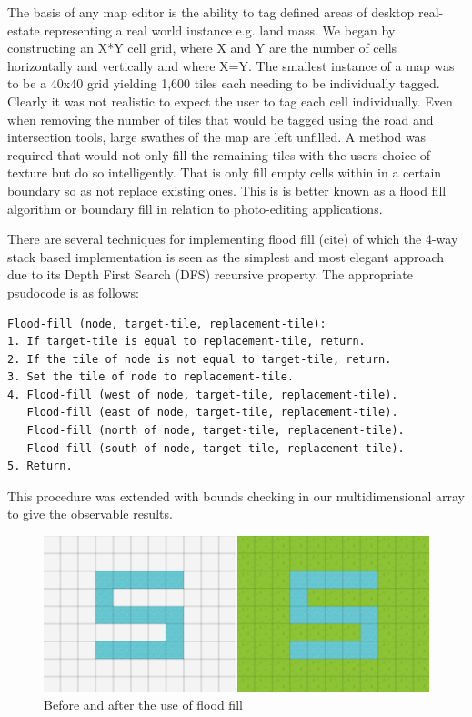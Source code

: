 The basis of any map editor is the ability to tag defined areas of desktop real-estate representing a real world instance e.g. land mass. We began by constructing an X*Y cell grid, where X and Y are the number of cells horizontally and vertically and where X=Y. The smallest instance of a map was to be a 40x40 grid yielding 1,600 tiles each needing to be individually tagged. Clearly it was not realistic to expect the user to tag each cell individually. Even when removing the number of tiles that would be tagged using the road and intersection tools, large swathes of the map are left unfilled.  
A method was required that would not only fill the remaining tiles with the users choice of texture but do so intelligently. That is only fill empty cells within in a certain boundary so as not replace existing ones.  This is is better known as a flood fill algorithm or boundary fill in relation to photo-editing applications.

There are several techniques for implementing flood fill (cite) of which the 4-way stack based implementation is seen as the simplest and most elegant approach due to its Depth First Search (DFS) recursive property.  The appropriate psudocode is as follows:

\begin{minipage}{0.9\textwidth}
	\begin{lstlisting}[caption={4-way stack based recursive flood fill}, label={lst:stackFloodFill}]
Flood-fill (node, target-tile, replacement-tile):
1. If target-tile is equal to replacement-tile, return.
2. If the tile of node is not equal to target-tile, return.
3. Set the tile of node to replacement-tile.
4. Flood-fill (west of node, target-tile, replacement-tile).
   Flood-fill (east of node, target-tile, replacement-tile).
   Flood-fill (north of node, target-tile, replacement-tile).
   Flood-fill (south of node, target-tile, replacement-tile).
5. Return.
	\end{lstlisting}
\end{minipage}

This procedure was extended with bounds checking in our multidimensional array to give the observable results.

\begin{figure}[h]
	\begin{center}
		\includegraphics[scale=0.8]{img/floodFill.png}
		\caption[Flood Fill]{Before and after the use of flood fill}
		\label{fig:animthread}
	\end{center}
\end{figure}

